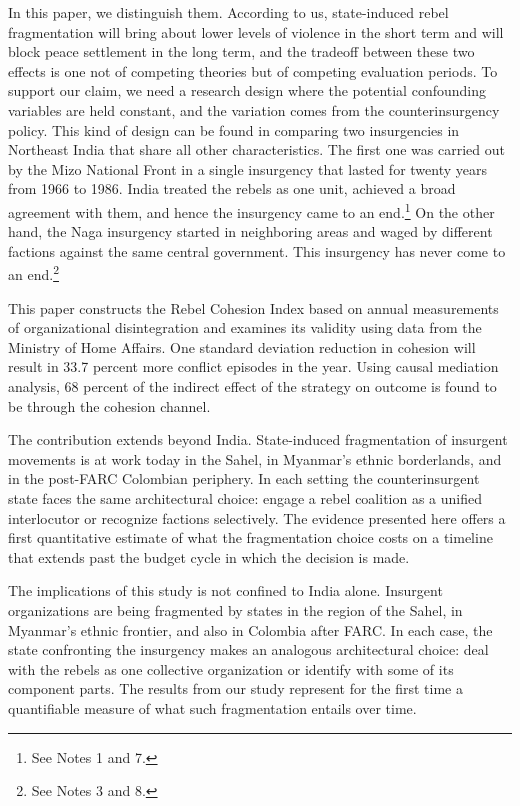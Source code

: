 \documentclass[12pt,a4paper]{article}
\begin{document}
In this paper, we distinguish them. According to us, state-induced rebel fragmentation will bring about lower levels of violence in the short term and will block peace settlement in the long term, and the tradeoff between these two effects is one not of competing theories but of competing evaluation periods. To support our claim, we need a research design where the potential confounding variables are held constant, and the variation comes from the counterinsurgency policy. This kind of design can be found in comparing two insurgencies in Northeast India that share all other characteristics. The first one was carried out by the Mizo National Front in a single insurgency that lasted for twenty years from 1966 to 1986. India treated the rebels as one unit, achieved a broad agreement with them, and hence the insurgency came to an end.\footnote{See Notes 1 and 7.} On the other hand, the Naga insurgency started in neighboring areas and waged by different factions against the same central government. This insurgency has never come to an end.\footnote{See Notes 3 and 8.}

This paper constructs the Rebel Cohesion Index based on annual measurements of organizational disintegration and examines its validity using data from the Ministry of Home Affairs. One standard deviation reduction in cohesion will result in 33.7 percent more conflict episodes in the year. Using causal mediation analysis, 68 percent of the indirect effect of the strategy on outcome is found to be through the cohesion channel. 

The contribution extends beyond India. State-induced fragmentation of insurgent movements is at work today in the Sahel, in Myanmar's ethnic borderlands, and in the post-FARC Colombian periphery. In each setting the counterinsurgent state faces the same architectural choice: engage a rebel coalition as a unified interlocutor or recognize factions selectively. The evidence presented here offers a first quantitative estimate of what the fragmentation choice costs on a timeline that extends past the budget cycle in which the decision is made.

The implications of this study is not confined to India alone. Insurgent organizations are being fragmented by states in the region of the Sahel, in Myanmar's ethnic frontier, and also in Colombia after FARC. In each case, the state confronting the insurgency makes an analogous architectural choice: deal with the rebels as one collective organization or identify with some of its component parts. The results from our study represent for the first time a quantifiable measure of what such fragmentation entails over time.
\end{document}

